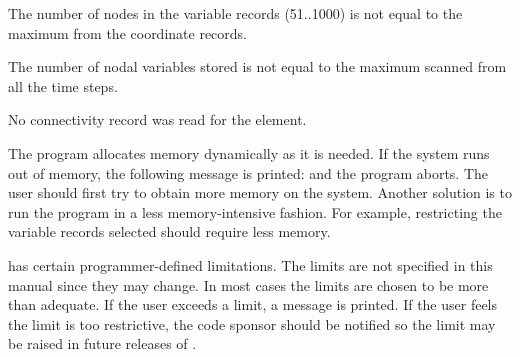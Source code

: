 {
The number of nodes in the variable records (51..1000) is not equal to
the maximum from the coordinate records.
}

{
The number of nodal variables stored is not equal to the maximum scanned
from all the time steps.
}

{
No connectivity record was read for the element.
}

The program allocates memory dynamically as it is needed. If the system
runs out of memory, the following message is printed:
and the program aborts. The user should first try to obtain more memory
on the system. Another solution is to run the program in a less
memory-intensive fashion. For example, restricting the variable records
selected should require less memory.

\caps{\PROGRAM} has certain programmer-defined limitations. The limits
are not specified in this manual since they may change. In most cases the
limits are chosen to be more than adequate. If the user exceeds a limit,
a message is printed. If the user feels the limit is too restrictive,
the code sponsor should be notified so the limit may be raised in future
releases of \caps{\PROGRAM}.
